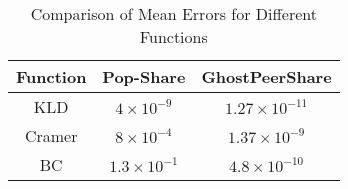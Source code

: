 \begin{table}[h!]
\centering
\begin{tabular}{|c|c|c|}
\hline
\textbf{Function} & \textbf{Pop-Share} & \textbf{GhostPeerShare} \\
\hline
KLD     & $4 \times 10^{-9}$ & $1.27 \times 10^{-11}$ \\
Cramer  & $8 \times 10^{-4}$ & $1.37 \times 10^{-9}$ \\
BC      & $1.3 \times 10^{-1}$ & $4.8 \times 10^{-10}$ \\
\hline
\end{tabular}
\caption{Comparison of Mean Errors for Different Functions}
\label{table:mean-error}
\end{table}
